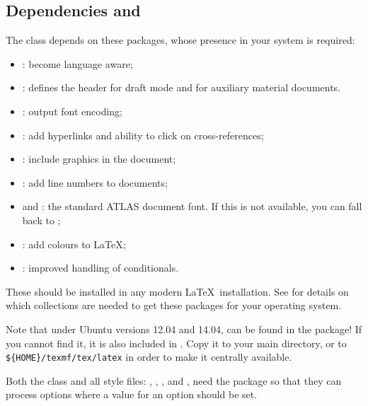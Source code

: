 \subsection{Dependencies and }
\label{sec:atlaspackage}

The  class depends on these packages, whose presence in
your system is required:
\begin{itemize}\setlength{\parskip}{0pt}\setlength{\itemsep}{0pt}
\item {}: become language aware;
\item {}: defines the header for draft mode
  and for auxiliary material documents.
\item {}: output font encoding;
\item {}: add hyperlinks and ability to click on cross-references;
\item {}: include graphics in the document;
\item {}: add line numbers to documents;
\item {} and : the standard ATLAS document font.
  If this is not available, you can fall back to ;
\item {}: add colours to \LaTeX;
\item {}: improved handling of conditionals.
\end{itemize}
These should be installed in any modern \LaTeX\ installation.
See \cite{latex-faq} for details on which collections are needed to get these packages
for your operating system.

Note that under Ubuntu versions 12.04 and 14.04,  can be found in the
 package!
If you cannot find it, it is also included in .
Copy it to your main directory, or to \verb|${HOME}/texmf/tex/latex| in order to make
it centrally available.

Both the class  and all style files:
, , ,  and ,
need the package  
so that they can process options where a value for an option should be set.

